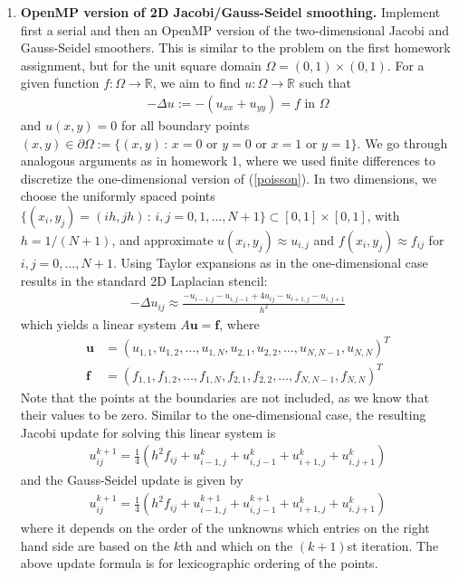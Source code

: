 \documentclass[10pt]{article}
\newcommand{\R}{\mathbb{R}}
\newcommand{\vb}[1]{\mathbf{#1}}
\newcommand{\lp}{\left(}
\newcommand{\rp}{\right)}
\begin{document}
\begin{enumerate}
\item \textbf{OpenMP version of 2D Jacobi/Gauss-Seidel smoothing.} Implement first a serial and then an OpenMP version of the two-dimensional Jacobi and Gauss-Seidel smoothers. This is similar to the problem on the first homework assignment, but for the unit square domain $\Omega = (0,1) \times (0,1)$. For a given function $f: \Omega \to \R$, we aim to find $u: \Omega \to \R$ such that
\begin{align}
-\Delta u := -\lp u_{xx} + u_{yy} \rp = f \text{ in } \Omega \label{poisson}
\end{align}
and $u(x,y) = 0$ for all boundary points $(x,y) \in \partial \Omega := \{(x,y) \, : \, x =0 \text{ or } y = 0 \text{ or } x=1 \text{ or } y = 1\}$. We go through analogous arguments as in homework 1, where we used finite differences to discretize the one-dimensional version of (\ref{poisson}). In two dimensions, we choose the uniformly spaced points $\{(x_{i}, y_{j}) = (ih, jh) \, : \, i,j =0,1, \dotsc, N+1\} \subset [0,1] \times [0,1]$, with $h = 1/(N+1)$, and approximate $u(x_{i}, y_{j}) \approx u_{i,j}$ and $f(x_{i},y_{j}) \approx f_{ij}$ for $i,j = 0, \dotsc, N+1$. Using Taylor expansions as in the one-dimensional case results in the standard 2D Laplacian stencil:
\begin{align*}
-\Delta u_{ij} \approx \frac{-u_{i-1,j} - u_{i,j-1} + 4 u_{ij} - u_{i+1,j} - u_{i,j+1}}{h^{2}}
\end{align*}
which yields a linear system $A\vb{u} = \vb{f}$, where
\begin{align*}
\vb{u} &= \lp  u_{1,1}, u_{1,2}, \dotsc, u_{1,N}, u_{2,1}, u_{2,2}, \dotsc, u_{N,N-1}, u_{N,N} \rp^{T}\\
\vb{f} &= \lp  f_{1,1}, f_{1,2}, \dotsc, f_{1,N}, f_{2,1}, f_{2,2}, \dotsc, f_{N,N-1}, f_{N,N} \rp^{T}
\end{align*}
Note that the points at the boundaries are not included, as we know that their values to be zero. Similar to the one-dimensional case, the resulting Jacobi update for solving this linear system is
\begin{align*}
u_{ij}^{k+1} = \frac{1}{4} \lp h^{2} f_{ij} + u_{i-1,j}^{k} + u_{i,j-1}^{k} + u_{i+1,j}^{k} + u_{i,j+1}^{k} \rp
\end{align*}
and the Gauss-Seidel update is given by
\begin{align*}
u_{ij}^{k+1} = \frac{1}{4} \lp h^{2} f_{ij} + u_{i-1,j}^{k+1} + u_{i,j-1}^{k+1} + u_{i+1,j}^{k} + u_{i,j+1}^{k} \rp
\end{align*}
where it depends on the order of the unknowns which entries on the right hand side are based on the $k$th and which on the $(k+1)$st iteration. The above update formula is for lexicographic ordering of the points.


\end{enumerate}
\end{document}

